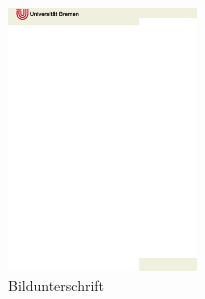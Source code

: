 \begin{figure}
 \includegraphics[width=5cm]{logos/titlepage.eps}
 \caption[Bild kurz]{Bildunterschrift}
 \label{fig:example}
\end{figure}
